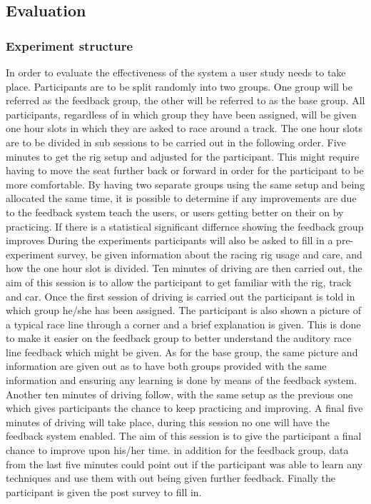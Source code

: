 \subsection{Evaluation}

\subsubsection{Experiment structure}
	In order to evaluate the effectiveness of the system a user study needs to take place. Participants are to be split randomly into two groups. One group will be referred as the feedback group, the other will be referred to as the base group. All participants, regardless of in which group they have been assigned, will be given one hour slots in which they are asked to race around a track. The one hour slots are to be divided in sub sessions to be carried out in the following order. Five minutes to get the rig setup and adjusted for the participant. This might require having to move the seat further back or forward in order for the participant to be more comfortable. By having two separate groups using the same setup and being allocated the same time, it is possible to determine if any improvements are due to the feedback system teach the users, or users getting better on their on by practicing. If there is a statistical significant differnce showing the feedback group  improves 
	During the experiments participants will also be asked to fill in a pre-experiment survey, be given information about the racing rig usage and care, and how the one hour slot is divided. Ten minutes of driving are then carried out, the aim of this session is to allow the participant to get familiar with the rig, track and car. Once the first session of driving is carried out the participant is told in which group he/she has been assigned. The participant is also shown a picture of a typical race line through a corner and a brief explanation is given. This is done to make it easier on the feedback group to better understand the auditory race line feedback which might be given. As for the base group, the same picture and information are given out as to have both groups provided with the same information and ensuring any learning is done by means of the feedback system. Another ten minutes of driving follow, with the same setup as the previous one which gives participants the chance to keep practicing and improving. A final five minutes of driving will take place, during this session no one will have the feedback system enabled. The aim of this session is to give the participant a final chance to improve upon his/her time. in addition for the feedback group, data from the last five minutes could point out if the participant was able to learn any techniques and use them with out being given further feedback. Finally the participant is given the post survey to fill in.

